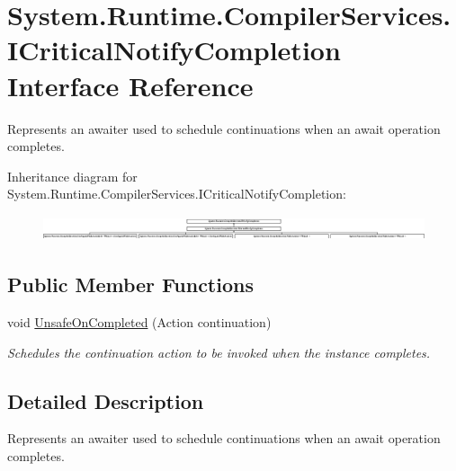\hypertarget{interface_system_1_1_runtime_1_1_compiler_services_1_1_i_critical_notify_completion}{}\section{System.\+Runtime.\+Compiler\+Services.\+I\+Critical\+Notify\+Completion Interface Reference}
\label{interface_system_1_1_runtime_1_1_compiler_services_1_1_i_critical_notify_completion}


Represents an awaiter used to schedule continuations when an await operation completes.  


Inheritance diagram for System.\+Runtime.\+Compiler\+Services.\+I\+Critical\+Notify\+Completion\+:\begin{figure}[H]
\begin{center}
\leavevmode
\includegraphics[height=0.748663cm]{interface_system_1_1_runtime_1_1_compiler_services_1_1_i_critical_notify_completion}
\end{center}
\end{figure}
\subsection*{Public Member Functions}
\begin{DoxyCompactItemize}
\item 
void \hyperlink{interface_system_1_1_runtime_1_1_compiler_services_1_1_i_critical_notify_completion_ad3e2080f494cf5b51ee57d9c4d704fc6}{Unsafe\+On\+Completed} (Action continuation)
\begin{DoxyCompactList}\small\item\em Schedules the continuation action to be invoked when the instance completes.\end{DoxyCompactList}\end{DoxyCompactItemize}


\subsection{Detailed Description}
Represents an awaiter used to schedule continuations when an await operation completes. 



